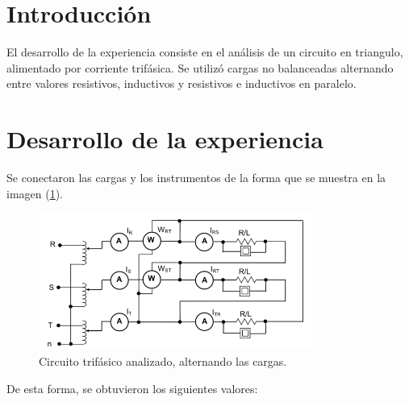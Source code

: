 \documentclass[a4paper]{article}
\begin{document}




\section*{Introducción}

El desarrollo de la experiencia consiste en el análisis de un circuito en triangulo, alimentado por corriente trifásica. Se utilizó cargas no balanceadas alternando entre valores resistivos, inductivos y resistivos e inductivos en paralelo.

\section*{Desarrollo de la experiencia}

Se conectaron las cargas y los instrumentos de la forma que se muestra en la imagen (\ref{fig:circuito}).

\begin{figure}[H]
	\centering
	\includegraphics[width=0.8\textwidth]{Circuito}
\caption{Circuito trifásico analizado, alternando las cargas.}
	\label{fig:circuito}
\end{figure}

De esta forma, se obtuvieron los siguientes valores:
\end{document}
